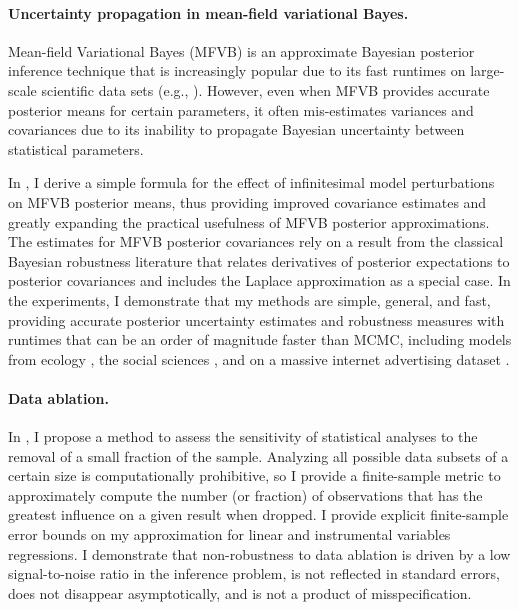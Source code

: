 \paragraph{Uncertainty propagation in mean-field variational Bayes.}

Mean-field Variational Bayes (MFVB) is an approximate Bayesian posterior
inference technique that is increasingly popular due to its fast runtimes on
large-scale scientific data sets (e.g., \citet{raj:2014:faststructure,
kucukelbir:2017:advi, regier:2019:cataloging}). However, even when MFVB provides
accurate posterior means for certain parameters, it often mis-estimates
variances and covariances \citep{wang:2005:inadequacy, turner:2011:two} due to
its inability to propagate Bayesian uncertainty between statistical parameters.

In \citet{giordano:2015:linear, giordano:2018:covariances}, I derive a simple
formula for the effect of infinitesimal model perturbations on MFVB posterior
means, thus providing improved covariance estimates and greatly expanding the
practical usefulness of MFVB posterior approximations. The estimates for MFVB
posterior covariances rely on a result from the classical Bayesian robustness
literature that relates derivatives of posterior expectations to posterior
covariances and includes the Laplace approximation as a special case.
In the experiments, I demonstrate that my methods are simple, general, and
fast, providing accurate posterior uncertainty estimates and robustness measures
with runtimes that can be an order of magnitude faster than MCMC, including
models from ecology \citep{kery:2011:bayesian}, the social sciences
\citep{gelman:2006:arm}, and on a massive internet advertising dataset
\citep{criteo:2014:dataset}.


\newpage

\paragraph{Data ablation.}

In \citet{giordano:2020:amip}, I propose a method to assess the sensitivity of
statistical analyses to the removal of a small fraction of the sample. Analyzing
all possible data subsets of a certain size is computationally prohibitive, so I
provide a finite-sample metric to approximately compute the number (or fraction)
of observations that has the greatest influence on a given result when dropped.
I provide explicit finite-sample error bounds on my approximation for linear
and instrumental variables regressions.
I demonstrate
that non-robustness to data ablation is driven by a low signal-to-noise ratio in
the inference problem, is not reflected in standard errors, does not disappear
asymptotically, and is not a product of misspecification.

